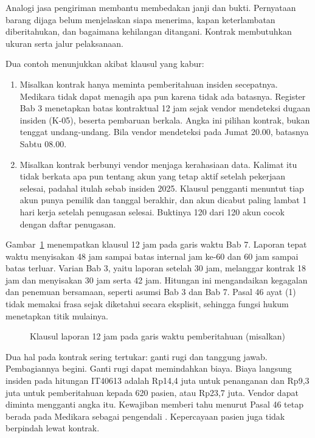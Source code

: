 Analogi jasa pengiriman membantu membedakan janji dan bukti. Pernyataan barang dijaga belum
menjelaskan siapa menerima, kapan keterlambatan diberitahukan, dan bagaimana kehilangan ditangani.
Kontrak membutuhkan ukuran serta jalur pelaksanaan.

Dua contoh menunjukkan akibat klausul yang kabur:
\begin{enumerate}
  \item Misalkan kontrak hanya meminta pemberitahuan insiden secepatnya. Medikara tidak dapat
  menagih apa pun karena tidak ada batasnya. Register Bab 3 menetapkan batas kontraktual 12 jam
  sejak vendor mendeteksi dugaan insiden (K-05), beserta pembaruan berkala. Angka ini pilihan
  kontrak, bukan tenggat undang-undang. Bila vendor mendeteksi pada Jumat 20.00, batasnya Sabtu
  08.00.
  \item Misalkan kontrak berbunyi vendor menjaga kerahasiaan data. Kalimat itu tidak berkata apa
  pun tentang akun yang tetap aktif setelah pekerjaan selesai, padahal itulah sebab insiden 2025.
  Klausul pengganti menuntut tiap akun punya pemilik dan tanggal berakhir, dan akun dicabut paling
  lambat 1 hari kerja setelah penugasan selesai. Buktinya 120 dari 120 akun cocok dengan daftar
  penugasan.
\end{enumerate}

Gambar~\ref{fig:ch09-waktu} menempatkan klausul 12 jam pada garis waktu Bab 7. Laporan tepat waktu
menyisakan 48 jam sampai batas internal jam ke-60 dan 60 jam sampai batas terluar. Varian Bab 3,
yaitu laporan setelah 30 jam, melanggar kontrak 18 jam dan menyisakan 30 jam serta 42 jam. Hitungan
ini mengandaikan kegagalan dan penemuan bersamaan, seperti asumsi Bab 3 dan Bab 7. Pasal 46 ayat (1)
tidak memakai frasa sejak diketahui secara eksplisit, sehingga fungsi hukum menetapkan titik
mulainya.

\begin{figure}[!htb]
  \centering
  
  \caption{Klausul laporan 12 jam pada garis waktu pemberitahuan (misalkan)}
  \label{fig:ch09-waktu}
\end{figure}

Dua hal pada kontrak sering tertukar: ganti rugi dan tanggung jawab. Pembagiannya begini. Ganti
rugi dapat memindahkan biaya. Biaya langsung insiden pada hitungan IT40613 adalah Rp14,4 juta untuk
penanganan dan Rp9,3 juta untuk pemberitahuan kepada 620 pasien, atau Rp23,7 juta. Vendor dapat
diminta mengganti angka itu. Kewajiban memberi tahu menurut Pasal 46 tetap berada pada Medikara
sebagai pengendali \cite{uu27-2022-pdp}. Kepercayaan pasien juga tidak berpindah lewat kontrak.

